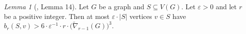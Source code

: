 \documentclass[1p,number,a4paper]{elsarticle}
\theoremstyle{remark}
\newcommand{\Pp}{\mathcal{P}}
\newcommand{\Qq}{\mathcal{Q}}
\renewcommand{\epsilon}{\varepsilon}
\newtheorem{lemma}[theorem]{Lemma}
\begin{document}
\begin{lemma}[\cite{pilipczuk2018parameterizedarxiv}, Lemma 14]\label{lem:adm-half}
Let $G$ be a graph and $S\subseteq V(G)$. Let $\varepsilon>0$
and let $r$ be a positive integer. Then at most $\varepsilon\cdot |S|$ vertices $v\in S$ have $b_r(S,v)>6\cdot\varepsilon^{-1}\cdot r\cdot \bigl(\widetilde\nabla_{r-1}(G)\bigr)^3$.
\end{lemma}
%
%
%
%
%
\end{document}
